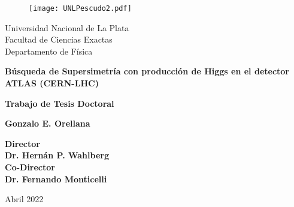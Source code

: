 


\thispagestyle{empty}
\begin{center}

\begin{figure}[h]
\centering
\texttt{[image: UNLPescudo2.pdf]}
\end{figure}

{\normalsize Universidad Nacional de La Plata\\}
{\normalsize Facultad de Ciencias Exactas\\}
{\normalsize Departamento de Física\\}


\vspace{2cm}

\hrulefill

{\bf \LARGE  Búsqueda de Supersimetría con producción de Higgs en el detector ATLAS (CERN-LHC)\\}

\vspace{0.6cm}

\hrulefill

\vspace{0.3cm}

{\normalsize \bf Trabajo de Tesis Doctoral \\}

\vspace{2.5cm}

{\Large \bf Gonzalo E. Orellana \\}

\vspace{3.5cm}

{\large\bf Director \\}
{\large\bf Dr. Hernán P. Wahlberg \\}
{\large\bf Co-Director \\}
{\large\bf Dr. Fernando Monticelli \\}

\vspace{2cm}

{\normalsize Abril 2022}

\end{center}



\restoregeometry




